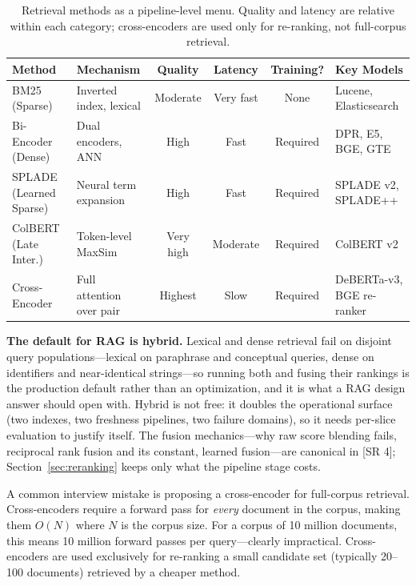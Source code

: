 \begin{table}[H]
\centering
\small
\begin{tabularx}{\textwidth}{@{}l l c c c X@{}}
\toprule
\textbf{Method} & \textbf{Mechanism} & \textbf{Quality} & \textbf{Latency} & \textbf{Training?} & \textbf{Key Models} \\
\midrule
BM25 (Sparse)       & Inverted index, lexical  & Moderate & Very fast & None    & Lucene, Elasticsearch \\
Bi-Encoder (Dense)   & Dual encoders, ANN       & High     & Fast      & Required & DPR, E5, BGE, GTE \\
SPLADE (Learned Sparse) & Neural term expansion & High     & Fast      & Required & SPLADE v2, SPLADE++ \\
ColBERT (Late Inter.)  & Token-level MaxSim     & Very high & Moderate & Required & ColBERT v2 \\
Cross-Encoder        & Full attention over pair  & Highest  & Slow      & Required & DeBERTa-v3, BGE re-ranker \\
\bottomrule
\end{tabularx}
\caption{Retrieval methods as a pipeline-level menu.  Quality and latency are
relative within each category; cross-encoders are used only for re-ranking,
not full-corpus retrieval.}
\label{tab:retrieval-comparison}
\end{table}

\textbf{The default for RAG is hybrid.}  Lexical and dense retrieval fail on
disjoint query populations---lexical on paraphrase and conceptual queries,
dense on identifiers and near-identical strings---so running both and fusing
their rankings is the production default rather than an optimization, and it
is what a RAG design answer should open with.  Hybrid is not free: it doubles
the operational surface (two indexes, two freshness pipelines, two failure
domains), so it needs per-slice evaluation to justify itself.  The fusion
mechanics---why raw score blending fails, reciprocal rank fusion and its
constant, learned fusion---are canonical in [SR 4];
Section~\ref{sec:reranking} keeps only what the pipeline stage costs.

\begin{warningbox}
A common interview mistake is proposing a cross-encoder for full-corpus
retrieval.  Cross-encoders require a forward pass for \emph{every} document in
the corpus, making them $O(N)$ where $N$ is the corpus size.  For a corpus of
10 million documents, this means 10 million forward passes per query---clearly
impractical.  Cross-encoders are used exclusively for re-ranking a small
candidate set (typically 20--100 documents) retrieved by a cheaper method.
\end{warningbox}


